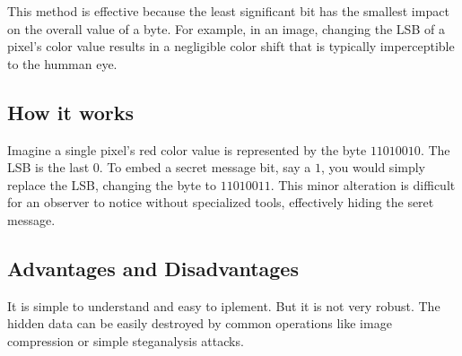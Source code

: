     This method is effective because the least significant bit has the smallest
    impact on the overall value of a byte. For example, in an image, changing
    the LSB of a pixel's color value results in a negligible color shift that is
    typically imperceptible to the humman eye.
    \subsection{How it works}
        Imagine a single pixel's red color value is represented by the byte
        \(11010010\). The LSB is the last \(0\). To embed a secret message bit,
        say a \(1\), you would simply replace the LSB, changing the byte to
        \(11010011\). This minor alteration is difficult for an observer to
        notice without specialized tools, effectively hiding the seret message.
    \subsection{Advantages and Disadvantages}
        It is simple to understand and easy to iplement. But it is not very
        robust. The hidden data can be easily destroyed by common operations
        like image compression or simple steganalysis attacks.

